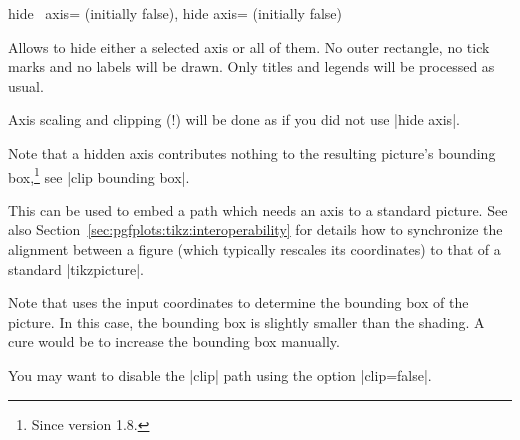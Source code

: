 \begin{pgfplotsxykeylist}{%
    hide \x\ axis= (initially false),
    hide axis= (initially false)%
}

    Allows to hide either a selected axis or all of them. No outer rectangle,
    no tick marks and no labels will be drawn. Only titles and legends will be
    processed as usual.

    Axis scaling and clipping (!) will be done as if you did not use
    |hide axis|.
\begin{codeexample}[]
\end{codeexample}

\begin{codeexample}[]
\end{codeexample}

    Note that a hidden axis contributes nothing to the resulting picture's
    bounding box,\footnote{Since version 1.8.} see
    |clip bounding box|.
\pgfplotsexpensiveexample
\begin{codeexample}[]
\end{codeexample}
    This can be used to embed a \PGFPlots{} path which needs an axis to a
    standard \tikzname{} picture. See also
    Section~\ref{sec:pgfplots:tikz:interoperability} for details how to synchronize
    the alignment between a \PGFPlots{} figure (which typically rescales its
    coordinates) to that of a standard |tikzpicture|.

    Note that \PGFPlots{} uses the input coordinates to determine the bounding
    box of the picture. In this case, the bounding box is slightly smaller than
    the shading. A cure would be to increase the bounding box manually.

    You may want to disable the |clip| path using the option |clip=false|.
\end{pgfplotsxykeylist}


